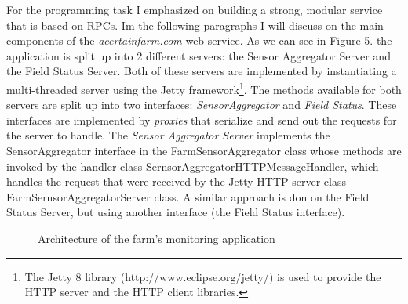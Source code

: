 \documentclass{article}      %
\begin{document}
For the programming task I emphasized on building a strong, modular service that is based on RPCs. Im the following paragraphs I will discuss on the main components of the \emph{acertainfarm.com} web-service. As we can see in Figure 5. the application is split up into 2 different servers: the Sensor Aggregator Server and the Field Status Server. Both of these servers are implemented by instantiating a multi-threaded server using the Jetty framework\footnote{The Jetty 8 library (http://www.eclipse.org/jetty/) is used to provide the HTTP server and the HTTP client libraries.}.  The methods available for both servers are split up into two interfaces: \emph{SensorAggregator} and \emph{Field Status}. These interfaces are implemented by \emph{proxies} that serialize and send out the requests for the server to handle. The \emph{Sensor Aggregator Server} implements the SensorAggregator interface in the FarmSensorAggregator class whose methods are invoked by the handler class SernsorAggregatorHTTPMessageHandler, which handles the request that were received by the Jetty HTTP server class FarmSernsorAggregatorServer class. A similar approach is don on the Field Status Server, but using another interface (the Field Status interface). \\

\begin{figure}[ht]
\centering

{%
\setlength{\fboxsep}{5pt}%
%
}%
\caption{Architecture of the farm's monitoring application \label{overflow}}
\end{figure}
\end{document}
